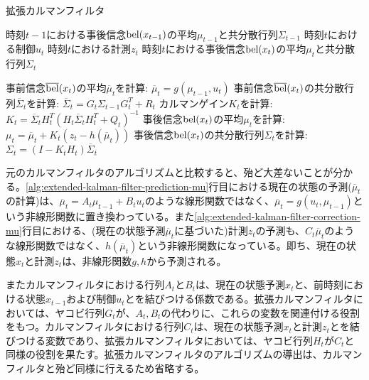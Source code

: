 \documentclass[dvipdfmx,a4paper]{jsarticle}
\begin{document}
\begin{algorithm}[H]
	\caption{拡張カルマンフィルタ}
	\label{alg:extended-kalman-filter}
	\begin{algorithmic}[1]
		\Require
			\Statex 時刻$t - 1$における事後信念$\operatorname{bel}(x_{t - 1})$の平均$\mu_{t - 1}$と共分散行列$\Sigma_{t - 1}$
			\Statex 時刻$t$における制御$u_t$
			\Statex 時刻$t$における計測$z_t$
		\Ensure
			\Statex 時刻$t$における事後信念$\operatorname{bel}(x_t)$の平均$\mu_t$と共分散行列$\Sigma_t$ \newline

		\State 事前信念$\operatorname{\overline{bel}}(x_t)$の平均$\overline{\mu}_t$を計算: $\overline{\mu}_t = g(\mu_{t - 1}, u_t)$ \label{alg:extended-kalman-filter-prediction-mu}
		\State 事前信念$\operatorname{\overline{bel}}(x_t)$の共分散行列$\overline{\Sigma}_t$を計算: $\overline{\Sigma}_t = G_t \Sigma_{t - 1} G_t^T + R_t$ \label{alg:extended-kalman-filter-prediction-sigma}
		\State カルマンゲイン$K_t$を計算: $K_t = \overline{\Sigma}_t H_t^T \left( H_t \overline{\Sigma}_t H_t^T + Q_t \right)^{-1}$ \label{alg:extended-kalman-filter-gain}
		\State 事後信念$\operatorname{bel}(x_t)$の平均$\mu_t$を計算: $\mu_t = \overline{\mu}_t + K_t \left( z_t - h(\overline{\mu}_t) \right)$ \label{alg:extended-kalman-filter-correction-mu}
		\State 事後信念$\operatorname{bel}(x_t)$の共分散行列$\Sigma_t$を計算: $\Sigma_t = \left( I - K_t H_t \right) \overline{\Sigma}_t$ \label{alg:kalman-filter-correction-sigma}
	\end{algorithmic}
\end{algorithm}

元のカルマンフィルタのアルゴリズムと比較すると、殆ど大差ないことが分かる。\ref{alg:extended-kalman-filter-prediction-mu}行目における現在の状態の予測($\overline{\mu}_t$の計算)は、$\overline{\mu}_t = A_t \mu_{t - 1} + B_t u_t$のような線形関数ではなく、$\overline{\mu}_t = g(u_t, \mu_{t - 1})$という非線形関数に置き換わっている。また\ref{alg:extended-kalman-filter-correction-mu}行目における、(現在の状態予測$\overline{\mu}_t$に基づいた)計測$z_t$の予測も、$C_t \overline{\mu}_t$のような線形関数ではなく、$h(\overline{\mu}_t)$という非線形関数になっている。即ち、現在の状態$x_t$と計測$z_t$は、非線形関数$g, h$から予測される。\newline

またカルマンフィルタにおける行列$A_t$と$B_t$は、現在の状態予測$x_t$と、前時刻における状態$x_{t - 1}$および制御$u_t$とを結びつける係数である。拡張カルマンフィルタにおいては、ヤコビ行列$G_t$が、$A_t, B_t$の代わりに、これらの変数を関連付ける役割をもつ。カルマンフィルタにおける行列$C_t$は、現在の状態予測$x_t$と計測$z_t$とを結びつける変数であり、拡張カルマンフィルタにおいては、ヤコビ行列$H_t$が$C_t$と同様の役割を果たす。拡張カルマンフィルタのアルゴリズムの導出は、カルマンフィルタと殆ど同様に行えるため省略する。



\end{document}
